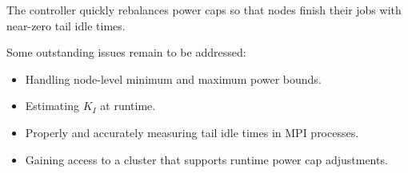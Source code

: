 \documentclass[a0,portrait]{a0poster}
\newcommand{\PAD}{\vskip 0.75cm}
\begin{document}
\begin{multicols}{2}
{
\PAD
\centering
      
  \label{fig:nlpb-sim}
\PAD
}

The controller quickly rebalances power caps so that nodes finish their jobs with near-zero tail idle times.

Some outstanding issues remain to be addressed:
\begin{itemize}
\item Handling node-level minimum and maximum power bounds.
\item Estimating $K_I$ at runtime.
\item Properly and accurately measuring tail idle times in MPI processes.
\item Gaining access to a cluster that supports runtime power cap adjustments.
\end{itemize}

\color{SaddleBrown} %




\color{DarkSlateGray} %







\end{multicols}
\end{document}
